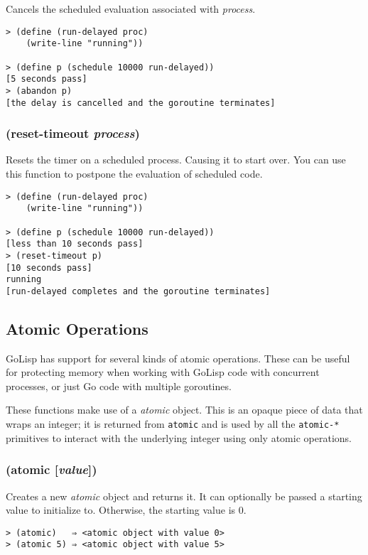 \documentclass{article}
\begin{document}
Cancels the scheduled evaluation associated with \emph{process}.

\begin{verbatim}
> (define (run-delayed proc)
    (write-line "running"))

> (define p (schedule 10000 run-delayed))
[5 seconds pass]
> (abandon p)
[the delay is cancelled and the goroutine terminates]
\end{verbatim}

\subsubsection{(reset-timeout \emph{process})}

Resets the timer on a scheduled process. Causing it to start over. You can use this function
to postpone the evaluation of scheduled code.

\begin{verbatim}
> (define (run-delayed proc)
    (write-line "running"))

> (define p (schedule 10000 run-delayed))
[less than 10 seconds pass]
> (reset-timeout p)
[10 seconds pass]
running
[run-delayed completes and the goroutine terminates]
\end{verbatim}

\subsection{Atomic Operations}\label{sec:atomic-operations}

GoLisp has support for several kinds of atomic operations. These can be useful for protecting
memory when working with GoLisp code with concurrent processes, or just Go code with multiple
goroutines.

These functions make use of a \emph{atomic} object. This is an opaque piece of data that wraps
an integer; it is returned from \verb|atomic| and is used by all the \verb|atomic-*|
primitives to interact with the underlying integer using only atomic operations.

\subsubsection{(atomic [\emph{value}])}

Creates a new \emph{atomic} object and returns it. It can optionally be passed a starting
value to initialize to. Otherwise, the starting value is 0.

\begin{verbatim}
> (atomic)   ⇒ <atomic object with value 0>
> (atomic 5) ⇒ <atomic object with value 5>
\end{verbatim}
\end{document}

